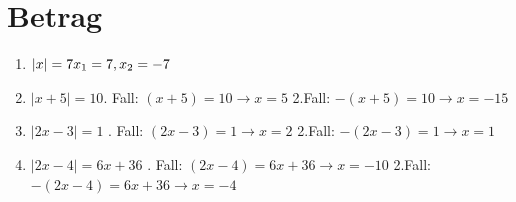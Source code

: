 \section{Betrag}
\begin{enumerate}
\item $|x| = 7\\
	  x_1=7, x_2= -7$
\item $|x + 5| = 10$. Fall:\newline
		$(x+5) = 10 \rightarrow x=5$ \newline
		2.Fall:  \newline
		$-(x+5)=10 \rightarrow x=-15$

\item $|2x - 3| = 1$ . Fall:\newline
		$(2x-3) = 1 \rightarrow x=2$ \newline
		2.Fall:  \newline
		$-(2x-3)=1 \rightarrow x=1$
\item $|2x - 4| = 6x + 36$ . Fall:\newline
		$(2x-4) = 6x+36 \rightarrow x=-10$ \newline
		2.Fall:  \newline
		$-(2x-4)=6x+36 \rightarrow x=-4$
\end{enumerate}

